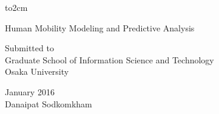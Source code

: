 
\begin{titlepage}
\vbox to2cm{}

\vspace{3cm}
\begin{center}

{\Large Human Mobility Modeling and Predictive Analysis}


\vspace{8cm}
{ \Large {Submitted to\\Graduate School of Information Science and Technology\\Osaka University}}

\vspace{1cm}
{ \Large {January 2016\\}}
\vspace{2cm}
{\Large {Danaipat Sodkomkham}}
\end{center}
\end{titlepage}